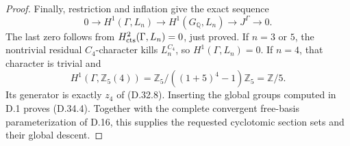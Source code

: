 \begin{proof}
Finally, restriction and inflation give
the exact sequence
\[
 0\longrightarrow H^1(\Gamma,L_n)
 \longrightarrow H^1(G_{\mathbb Q},L_n)
 \longrightarrow J^\Gamma\longrightarrow0.
                                                        \tag{D.34.10}
\]
The last zero follows from
\(H^2_{\rm cts}(\Gamma,L_n)=0\), just
proved. If \(n=3\) or \(5\), the
nontrivial residual \(C_4\)-character
kills \(L_n^{C_4}\), so
\(H^1(\Gamma,L_n)=0\). If \(n=4\),
that character is trivial and
\[
 H^1(\Gamma,\mathbb Z_5(4))
  =\mathbb Z_5/((1+5)^4-1)\mathbb Z_5
  =\mathbb Z/5.
 \]
Its generator is exactly \(z_4\) of
(D.32.8). Inserting the global groups
computed in D.1 proves (D.34.4).
Together with the complete convergent
free-basis parameterization of D.16,
this supplies the requested cyclotomic
section sets and their global descent.
\end{proof}

